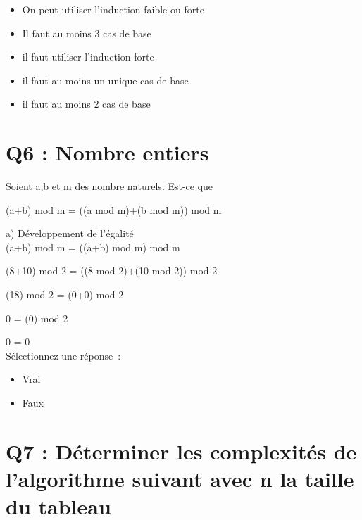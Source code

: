 \begin{itemize}[label=$\square$]
\item On peut utiliser l’induction faible ou forte
\item Il faut au moins 3 cas de base
\item il faut utiliser l’induction forte
\item il faut au moins un unique cas de base
\item il faut au moins 2 cas de base
\end{itemize}

\vspace{5mm} %

\section{Q6 : Nombre entiers}

\vspace{5mm} %


Soient a,b et m des nombre naturels. Est-ce que

\vspace{2mm} %

(a+b) mod m = ((a mod m)+(b mod m)) mod m \\

\vspace{4mm} %

a) Développement de l'égalité \\

(a+b) mod m = ((a+b) mod m) mod m

(8+10) mod 2 = ((8 mod 2)+(10 mod 2)) mod 2

(18) mod 2 = (0+0) mod 2

0 = (0) mod 2

0 = 0 \\

Sélectionnez une réponse :
\begin{itemize}[label=$\square$]
\item Vrai
\item Faux
\end{itemize}


\newpage
\section{Q7 : Déterminer les complexités de l’algorithme suivant avec n la taille du tableau}

\vspace{5mm} %

